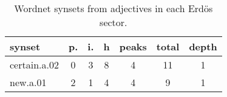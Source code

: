 \begin{table}[h!]
\begin{center}
\begin{tabular}{| l | c | c | c | c | c | c |}\hline
synset & p. & i. & h & peaks & total & depth \\\hline
certain.a.02 & 0  & 3  & 8  & 4  & 11  & 1 \\\hline
new.a.01 & 2  & 1  & 4  & 4  & 9  & 1 \\\hline
\end{tabular}
\caption{Wordnet synsets from adjectives in each Erd\"os sector.}
\end{center}
\end{table}